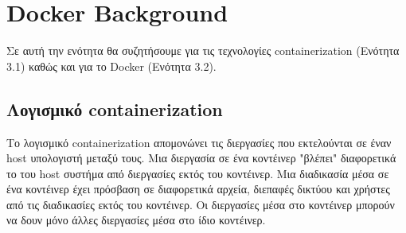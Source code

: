 \chapter{\textlatin{Docker Background}}
\label{dockerBackground}

Σε αυτή την ενότητα θα συζητήσουμε για τις τεχνολογίες
\textlatin{containerization} (Ενότητα 3.1) καθώς και για το
\textlatin{Docker} (Ενότητα 3.2).


\section{Λογισμικό \textlatin{containerization}}

Το λογισμικό \textlatin{containerization} απομονώνει τις διεργασίες που
εκτελούνται σε έναν \textlatin{host} υπολογιστή μεταξύ τους. Μια διεργασία σε
ένα κοντέινερ "βλέπει" διαφορετικά το του \textlatin{host} συστήμα από διεργασίες εκτός του
κοντέινερ. Μια διαδικασία μέσα σε ένα κοντέινερ έχει πρόσβαση σε διαφορετικά
αρχεία, διεπαφές δικτύου και χρήστες από τις διαδικασίες εκτός του κοντέινερ.
Οι διεργασίες μέσα στο κοντέινερ μπορούν να δουν μόνο άλλες διεργασίες μέσα
στο ίδιο κοντέινερ.


